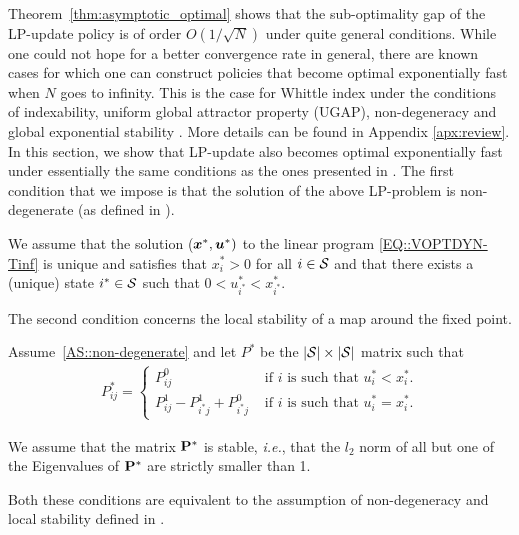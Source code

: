 Theorem~\ref{thm:asymptotic_optimal} shows that the sub-optimality gap of the LP-update policy is of order $O(1/\sqrt{N})$ under quite general conditions. While one could not hope for a better convergence rate in general, there are known cases for which one can construct policies that become optimal exponentially fast when $N$ goes to infinity. This is the case for Whittle index under the conditions of indexability, uniform global attractor property (UGAP), non-degeneracy and global exponential stability \cite{GGY23}. More details can be found in Appendix \ref{apx:review}. %
In this section, we show that LP-update also becomes optimal exponentially fast under essentially the same conditions as the ones presented in \cite{HXCW24}. The first condition that we impose is that the solution of the above LP-problem is non-degenerate (as defined in \citet{GGY23,HXCW24}). 
\begin{assumption}
    \label{AS::non-degenerate}
    We assume that the solution (${\bm{x}}^*,\bm{u}^*)$ to the linear program \eqref{EQ::VOPTDYN-Tinf} is unique and satisfies that $x^*_i>0$ for all $i\in\mathcal{S}$ and that there exists a (unique) state $i^*\in\mathcal{S}$ such that $0 < u^*_{i^*} < x^*_{i^*}$.
\end{assumption}

The second condition concerns the local stability of a map around the fixed point.
\begin{assumption}
    \label{AS::stable}
    Assume~\ref{AS::non-degenerate} and let $P^*$ be the $|\mathcal{S}|\times|\mathcal{S}|$ matrix such that 
    \begin{align*}
        P^*_{ij} = \left\{\begin{array}{ll}
            P^0_{ij} &\text{ if $i$ is such that $u^*_i<x^*_i$.}\\
            P^1_{ij}-P^{1}_{i^*j}+P^{0}_{i^*j} &\text{ if $i$ is such that $u^*_i=x^*_i$.}
        \end{array}\right.
    \end{align*}
    
    We assume that the matrix $\mathbf{P}^{*}$ is stable, \emph{i.e.}, that the $l_2$ norm of all but one of the Eigenvalues of $\mathbf{P}^{*}$ are strictly smaller than 1.%
\end{assumption}
Both these conditions are equivalent to the assumption of non-degeneracy and local stability defined in \cite{HXCW24}.

